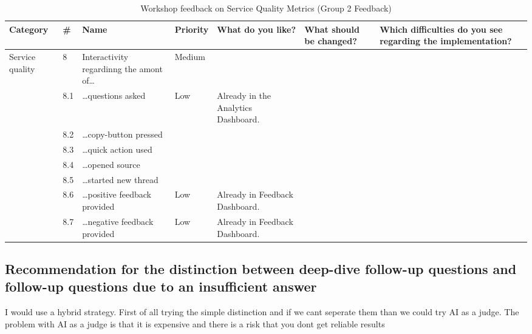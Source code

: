 \documentclass[
	english,
	ruledheaders=section,%
	class=report,%
	thesis={type=bachelor},%
	accentcolor=1b,%
	custommargins=true,%
	marginpar=false,%
	parskip=half-,%
	fontsize=11pt,%
	DIV=14,
]{tudapub}
\begin{document}
\begin{table}
    \centering
    \small 
    \caption{Workshop feedback on Service Quality Metrics (Group 2 Feedback)}
    \label{tab:service_quality_g2}
    \begin{tabularx}{\textheight}{p{2.2cm} l >{\RaggedRight\arraybackslash}X l >{\RaggedRight\arraybackslash}X >{\RaggedRight\arraybackslash}X >{\RaggedRight\arraybackslash}X}
        \toprule
        \textbf{Category} & \textbf{\#} & \textbf{Name} & \textbf{Priority} & \textbf{What do you like?} & \textbf{What should be changed?} & \textbf{Which difficulties do you see regarding the implementation?} \\
        \midrule

        \multirow{8}{=}{Service quality} 
        & 8 & Interactivity regardinng the amont of\dots & Medium & & & \\
        \cmidrule(l){2-7}
        & 8.1 & \dots questions asked & Low & Already in the Analytics Dashboard. & & \\
        \cmidrule(l){2-7}
        & 8.2 & \dots copy-button pressed & & & & \\
        \cmidrule(l){2-7}
        & 8.3 & \dots quick action used & & & & \\
        \cmidrule(l){2-7}
        & 8.4 & \dots opened source & & & & \\
        \cmidrule(l){2-7}
        & 8.5 & \dots started new thread & & & & \\
        \cmidrule(l){2-7}
        & 8.6 & \dots positive feedback provided & Low & Already in Feedback Dashboard. & & \\
        \cmidrule(l){2-7}
        & 8.7 & \dots negative feedback provided & Low & Already in Feedback Dashboard. & & \\
        \bottomrule
    \end{tabularx}
\end{table}

\clearpage %

\subsection*{Recommendation for the distinction between deep-dive follow-up questions and follow-up questions due to an insufficient answer}
\label{section:recommendation-follow-ups}
I would use a hybrid strategy. First of all trying the simple distinction and if we cant seperate them than we could try AI as a judge. The problem with AI as a judge is that it is expensive and there is a risk that you dont get reliable results
\end{document}

